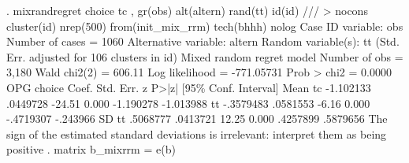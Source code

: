 . mixrandregret choice  tc , gr(obs) alt(altern) rand(tt) id(id) ///
> nocons cluster(id)  nrep(500) from(init_mix_rrm) tech(bhhh)  nolog
{\smallskip}
Case ID variable: obs                          Number of cases    =       1060
Alternative variable: altern                   
Random variable(s): tt                         
{\smallskip}
                                 (Std. Err. adjusted for  106 clusters in id)
{\smallskip}
Mixed random regret model                       Number of obs     =      3,180
                                                Wald chi2(2)      =     606.11
Log likelihood = -771.05731                     Prob > chi2       =     0.0000
{\smallskip}
             {\VBAR}                 OPG
      choice {\VBAR}      Coef.   Std. Err.      z    P>|z|     [95\% Conf. Interval]
Mean         {\VBAR}
          tc {\VBAR}  -1.102133   .0449728   -24.51   0.000    -1.190278   -1.013988
          tt {\VBAR}  -.3579483   .0581553    -6.16   0.000    -.4719307    -.243966
SD           {\VBAR}
          tt {\VBAR}   .5068777   .0413721    12.25   0.000     .4257899    .5879656
{\smallskip}
The sign of the estimated standard deviations is irrelevant: interpret them as
being positive
{\smallskip}
. matrix b_mixrrm = e(b)
{\smallskip}
